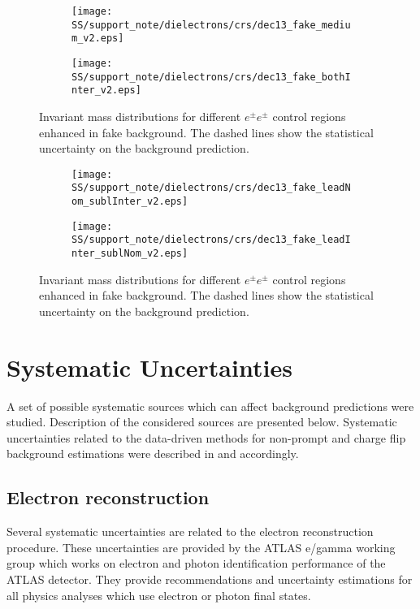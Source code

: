 \begin{figure}
\begin{subfigure}{.5\textwidth}
  \centering
  \texttt{[image: SS/support\_note/dielectrons/crs/dec13\_fake\_medium\_v2.eps]}
\end{subfigure}%
\begin{subfigure}{.5\textwidth}
  \centering
  \texttt{[image: SS/support\_note/dielectrons/crs/dec13\_fake\_bothInter\_v2.eps]}
\end{subfigure}
\caption{\toDo Invariant mass distributions for different $e^{\pm}e^{\pm}$ control regions enhanced in fake background. 
The dashed lines show the statistical uncertainty on the background prediction.}
  \label{fig:fakeCR_part1}
\end{figure}

\begin{figure}
\begin{subfigure}{.5\textwidth}
  \centering
  \texttt{[image: SS/support\_note/dielectrons/crs/dec13\_fake\_leadNom\_sublInter\_v2.eps]}
\end{subfigure}%
\begin{subfigure}{.5\textwidth}
  \centering
  \texttt{[image: SS/support\_note/dielectrons/crs/dec13\_fake\_leadInter\_sublNom\_v2.eps]}
\end{subfigure}
\caption{\toDo Invariant mass distributions for different $e^{\pm}e^{\pm}$ control regions enhanced in fake background. 
The dashed lines show the statistical uncertainty on the background prediction.}
  \label{fig:fakeCR_part2}
\end{figure}



\section{Systematic Uncertainties}
\label{sec:ss_Systematics}


A set of possible systematic sources which can affect background predictions were studied.
Description of the considered sources are presented below.
Systematic uncertainties related to the data-driven methods for non-prompt and charge flip background estimations
were described in  and  accordingly.

\subsection{Electron reconstruction}
Several systematic uncertainties are related to the electron reconstruction procedure.
These uncertainties are provided by the ATLAS e/gamma working group which works on electron and photon identification performance of the ATLAS detector.
They provide recommendations and uncertainty estimations for all physics analyses which use electron or photon final states.

